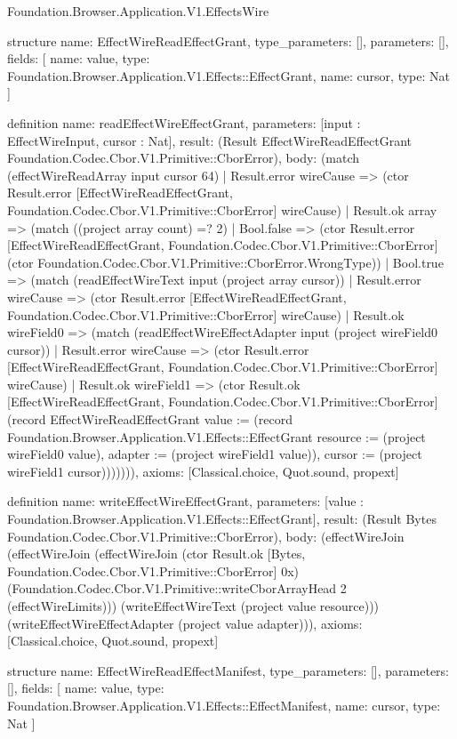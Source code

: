 \begin{lexlean}{Foundation.Browser.Application.V1.EffectsWire}
\begin{semanticmodule}
structure{
  name: EffectWireReadEffectGrant,
  type_parameters: [],
  parameters: [],
  fields: [
    {name: value, type: Foundation.Browser.Application.V1.Effects::EffectGrant},
    {name: cursor, type: Nat}
  ]
}

definition{
  name: readEffectWireEffectGrant,
  parameters: [input : EffectWireInput, cursor : Nat],
  result: (Result EffectWireReadEffectGrant Foundation.Codec.Cbor.V1.Primitive::CborError),
  body: (match (effectWireReadArray input cursor 64)
    | Result.error wireCause => (ctor Result.error [EffectWireReadEffectGrant, Foundation.Codec.Cbor.V1.Primitive::CborError] wireCause)
    | Result.ok array => (match ((project array count) =? 2)
      | Bool.false => (ctor Result.error [EffectWireReadEffectGrant, Foundation.Codec.Cbor.V1.Primitive::CborError] (ctor Foundation.Codec.Cbor.V1.Primitive::CborError.WrongType))
      | Bool.true => (match (readEffectWireText input (project array cursor))
        | Result.error wireCause => (ctor Result.error [EffectWireReadEffectGrant, Foundation.Codec.Cbor.V1.Primitive::CborError] wireCause)
        | Result.ok wireField0 => (match (readEffectWireEffectAdapter input (project wireField0 cursor))
          | Result.error wireCause => (ctor Result.error [EffectWireReadEffectGrant, Foundation.Codec.Cbor.V1.Primitive::CborError] wireCause)
          | Result.ok wireField1 => (ctor Result.ok [EffectWireReadEffectGrant, Foundation.Codec.Cbor.V1.Primitive::CborError] (record EffectWireReadEffectGrant {value := (record Foundation.Browser.Application.V1.Effects::EffectGrant {resource := (project wireField0 value), adapter := (project wireField1 value)}), cursor := (project wireField1 cursor)})))))),
  axioms: [Classical.choice, Quot.sound, propext]
}

definition{
  name: writeEffectWireEffectGrant,
  parameters: [value : Foundation.Browser.Application.V1.Effects::EffectGrant],
  result: (Result Bytes Foundation.Codec.Cbor.V1.Primitive::CborError),
  body: (effectWireJoin (effectWireJoin (effectWireJoin (ctor Result.ok [Bytes, Foundation.Codec.Cbor.V1.Primitive::CborError] 0x) (Foundation.Codec.Cbor.V1.Primitive::writeCborArrayHead 2 (effectWireLimits))) (writeEffectWireText (project value resource))) (writeEffectWireEffectAdapter (project value adapter))),
  axioms: [Classical.choice, Quot.sound, propext]
}

structure{
  name: EffectWireReadEffectManifest,
  type_parameters: [],
  parameters: [],
  fields: [
    {name: value, type: Foundation.Browser.Application.V1.Effects::EffectManifest},
    {name: cursor, type: Nat}
  ]
}


\end{semanticmodule}
\end{lexlean}

